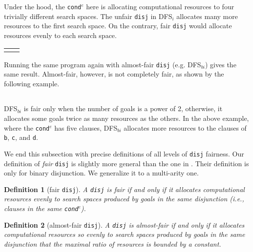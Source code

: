 \documentclass[format=acmlarge, review=true, authordraft=true]{acmart}
\newcommand{\conde}{\texttt{cond$^e$}}
\newcommand{\disj}{\texttt{disj}}
\newcommand{\DFSi }[0]{DFS$_{i}$}
\newcommand{\DFSbi}[0]{DFS$_{bi}$}
\newtheorem{defn}{Definition}[section]
\begin{document}
\begin{center}
	\begin{tabular}{c}
		
	\end{tabular}
\end{center}

Under the hood, the \conde{} here is allocating computational resources to 
four trivially different search spaces. The unfair \disj{} in 
\DFSi{} allocates many more resources to the first search space. On the 
contrary, fair \disj{} would allocate resources evenly to each search space. 

\begin{center}
	\begin{tabular}{l|r}
		 &
		
	\end{tabular}
\end{center}

Running the same program again with almost-fair \disj {} (e.g. 
\DFSbi{}) gives the same result. Almost-fair, however, is not 
completely fair, as shown by the following example. 

\begin{center}
	\begin{tabular}{c}
		
	\end{tabular}
\end{center}

\DFSbi{} is fair only when the number of goals is a power of 2, 
otherwise, it allocates some goals twice as many resources as the 
others. In the above example, where the \conde{} has five clauses, \DFSbi{} 
allocates more resources to the clauses of \texttt{b}, \texttt{c}, and 
\texttt{d}.

We end this subsection with precise definitions of all levels of 
\disj{} fairness. Our definition of \emph{fair} \disj{} is slightly 
more general
than the one in \citet{seres1999algebra}. Their definition is only
for binary disjunction. We generalize it to a multi-arity one.

\begin{defn}[fair \disj{}]
A \disj{} is fair if and only if it allocates computational resources evenly to 
search spaces produced by goals in the same disjunction 
(i.e., clauses in the same \conde).
\end{defn}

\begin{defn}[almost-fair \disj{}]
A \disj{} is almost-fair if and only if it allocates computational resources
so evenly to search spaces produced by goals in the same disjunction that 
the maximal ratio of resources is bounded by a constant.
\end{defn}
\end{document}

